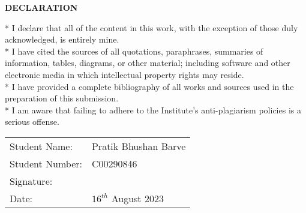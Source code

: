 \thispagestyle{empty}
\begin{titlepage}
\begin{center}
    \textbf{DECLARATION}
\end{center}

\begin{flushleft}
    * I declare that all of the content in this work, with the exception of those duly acknowledged, is entirely mine.\\
    * I have cited the sources of all quotations, paraphrases, summaries of information, tables, diagrams, or other material; including software and other electronic media in which intellectual property rights may reside.\\
    * I have provided a complete bibliography of all works and sources used in the preparation of this submission.\\
    * I am aware that failing to adhere to the Institute's anti-plagiarism policies is a serious offense.
\end{flushleft}

\vspace{8cm}
\renewcommand{\arraystretch}{2}
\begin{tabular}{ll}
    Student Name: & Pratik Bhushan Barve \\
    Student Number: & C00290846 \\
    Signature: & \\
    Date: & $16^{th}$ August $2023$ \\
\end{tabular}
\renewcommand{\arraystretch}{1}
\end{titlepage}